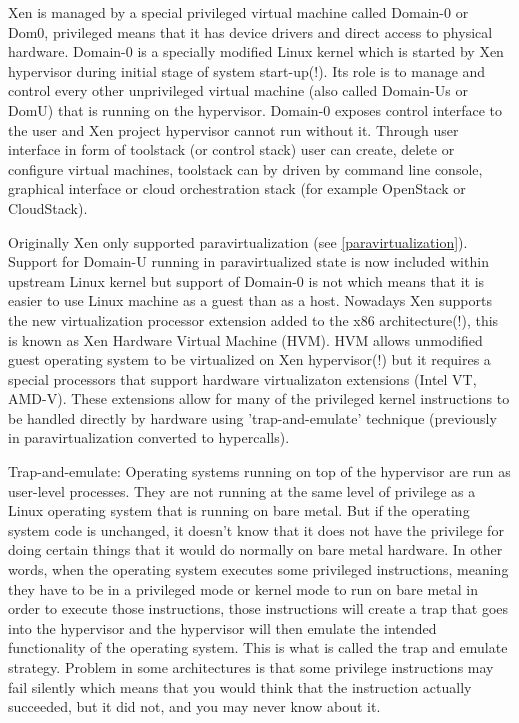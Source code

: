 Xen is managed by a special privileged virtual machine called Domain-0 or Dom0, privileged means that it has device drivers and direct access to physical hardware. Domain-0 is a specially modified Linux kernel which is started by Xen hypervisor during initial stage of system start-up(!). Its role is to manage and control every other unprivileged virtual machine (also called Domain-Us or DomU) that is running on the hypervisor. Domain-0 exposes control interface to the user and Xen project hypervisor cannot run without it. Through user interface in form of toolstack (or control stack) user can create, delete or configure virtual machines, toolstack can by driven by command line console, graphical interface or cloud orchestration stack (for example OpenStack or CloudStack).

Originally Xen only supported paravirtualization (see \ref{paravirtualization}). Support for Domain-U running in paravirtualized state is now included within upstream Linux kernel but support of Domain-0 is not which means that it is easier to use Linux machine as a guest than as a host. Nowadays Xen supports the new virtualization processor extension added to the x86 architecture(!), this is known as Xen Hardware Virtual Machine (HVM). HVM allows unmodified guest operating system to be virtualized on Xen hypervisor(!) but it requires a special processors that support hardware virtualizaton extensions (Intel VT, AMD-V). These extensions allow for many of the privileged kernel instructions to be handled directly by hardware using 'trap-and-emulate' technique (previously in paravirtualization converted to hypercalls).

Trap-and-emulate: Operating systems running on top of the hypervisor are run as user-level processes. They are not running at the same level of privilege as a Linux operating system that is running on bare metal. But if the operating system code is unchanged, it doesn't know that it does not have the privilege for doing certain things that it would do normally on bare metal hardware. In other words, when the operating system executes some privileged instructions, meaning they have to be in a privileged mode or kernel mode to run on bare metal in order to execute those instructions, those instructions will create a trap that goes into the hypervisor and the hypervisor will then emulate the intended functionality of the operating system. This is what is called the trap and emulate strategy. Problem in some architectures is that some privilege instructions may fail silently which means that you would think that the instruction actually succeeded, but it did not, and you may never know about it.

